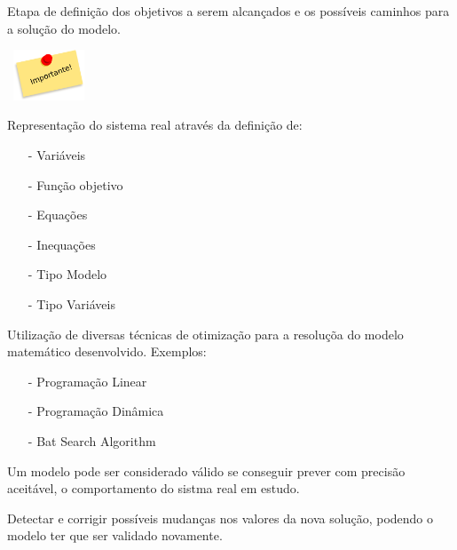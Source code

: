 \documentclass{beamer}
\begin{document}
\begin{frame}
\begin{columns}
		\begin{column}{0.3\textwidth}
			\only<2>
			{
				\begin{mdframed}[backgroundcolor=red!55] 
						\scriptsize
				        Etapa de definição dos objetivos a serem alcançados e os possíveis caminhos para a solução do modelo.
				\end{mdframed}
			}
			\only<3>
			{
				\centering
				\includegraphics[width=2.5cm,height=1.5cm]{importante.png}
				\begin{mdframed}[backgroundcolor=red!55]
					Representação do sistema real através da definição de: 
					\scriptsize
					\begin{itemize}
						\item[-] Variáveis
						\item[-] Função objetivo
						\item[-] Equações
						\item[-] Inequações
						\item[-] Tipo Modelo
						\item[-] Tipo Variáveis
					\end{itemize}
				\end{mdframed}
			}	
			\only<4>
			{
				\begin{mdframed}[backgroundcolor=red!55] 
					\scriptsize
					Utilização de diversas técnicas de otimização para a resoluçõa do modelo matemático desenvolvido. Exemplos:
					\begin{itemize}
					\item[-] Programação Linear
					\item[-] Programação Dinâmica
					\item[-] Bat Search Algorithm
					\end{itemize}
				\end{mdframed}
			}
			\only<5>
			{
				\begin{mdframed}[backgroundcolor=red!55] 
					\scriptsize
					Um modelo pode ser considerado válido se conseguir prever com precisão aceitável, o comportamento do sistma real em estudo.
				\end{mdframed}
			}	
			\only<6>
			{
				\begin{mdframed}[backgroundcolor=red!55] 
					\scriptsize
					Detectar e corrigir possíveis mudanças nos valores da nova solução, podendo o modelo ter que ser validado novamente.

\end{mdframed}}
\end{column}
\end{columns}
\end{frame}
\end{document}

